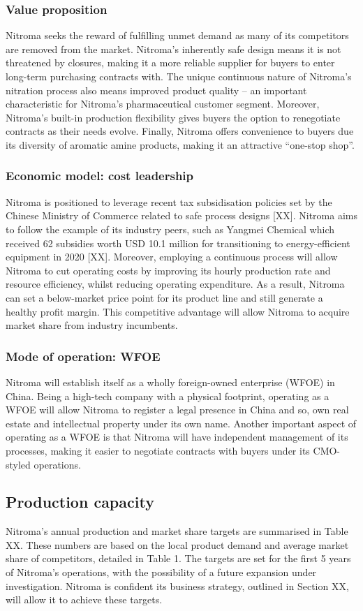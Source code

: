 \subsubsection{Value proposition}
Nitroma seeks the reward of fulfilling unmet demand as many of its competitors are removed from the market. Nitroma’s inherently safe design means it is not threatened by closures, making it a more reliable supplier for buyers to enter long-term purchasing contracts with. The unique continuous nature of Nitroma’s nitration process also means improved product quality – an important characteristic for Nitroma’s pharmaceutical customer segment. Moreover, Nitroma’s built-in production flexibility gives buyers the option to renegotiate contracts as their needs evolve. Finally, Nitroma offers convenience to buyers due its diversity of aromatic amine products, making it an attractive “one-stop shop”.
\subsubsection{Economic model: cost leadership}
Nitroma is positioned to leverage recent tax subsidisation policies set by the Chinese Ministry of Commerce related to safe process designs [XX]. Nitroma aims to follow the example of its industry peers, such as Yangmei Chemical which received 62 subsidies worth USD 10.1 million for transitioning to energy-efficient equipment in 2020 [XX]. Moreover, employing a continuous process will allow Nitroma to cut operating costs by improving its hourly production rate and resource efficiency, whilst reducing operating expenditure. As a result, Nitroma can set a below-market price point for its product line and still generate a healthy profit margin. This competitive advantage will allow Nitroma to acquire market share from industry incumbents. 
\subsubsection{Mode of operation: WFOE}
Nitroma will establish itself as a wholly foreign-owned enterprise (WFOE) in China. Being a high-tech company with a physical footprint, operating as a WFOE will allow Nitroma to register a legal presence in China and so, own real estate and intellectual property under its own name. Another important aspect of operating as a WFOE is that Nitroma will have independent management of its processes, making it easier to negotiate contracts with buyers under its CMO-styled operations.

\subsection{Production capacity}
Nitroma’s annual production and market share targets are summarised in Table XX. These numbers are based on the local product demand and average market share of competitors, detailed in Table 1. The targets are set for the first 5 years of Nitroma’s operations, with the possibility of a future expansion under investigation. Nitroma is confident its business strategy, outlined in Section XX, will allow it to achieve these targets. 

